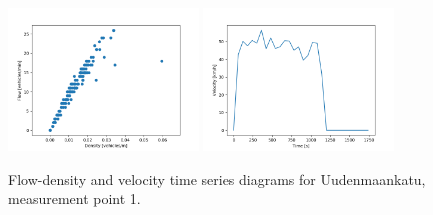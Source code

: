 \documentclass[english, 12pt, a4paper, elec, utf8, pdfa, online]{aaltothesis}
\begin{document}
\begin{figure}[ht!]
    \centering
    \includegraphics[width=0.45\textwidth]{graphs/Uudenmaankatu_1_flw_dns.png}
    \includegraphics[width=0.45\textwidth]{graphs/Uudenmaankatu_1_spd_time_6.png}
    \caption{Flow-density and velocity time series diagrams for Uudenmaankatu, measurement point 1.}
\end{figure}
\end{document}
